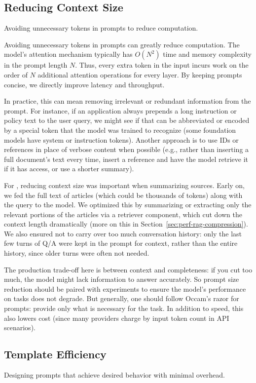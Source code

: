 \subsection{Reducing Context Size}
Avoiding unnecessary tokens in prompts to reduce computation.

Avoiding unnecessary tokens in prompts can greatly reduce computation. The model’s attention mechanism typically has $O(N^2)$ time and memory complexity in the prompt length $N$. Thus, every extra token in the input incurs work on the order of $N$ additional attention operations for every layer. By keeping prompts concise, we directly improve latency and throughput.

In practice, this can mean removing irrelevant or redundant information from the prompt. For instance, if an application always prepends a long instruction or policy text to the user query, we might see if that can be abbreviated or encoded by a special token that the model was trained to recognize (some foundation models have system or instruction tokens). Another approach is to use IDs or references in place of verbose content when possible (e.g., rather than inserting a full document’s text every time, insert a reference and have the model retrieve it if it has access, or use a shorter summary).

For \ishtar{}, reducing context size was important when summarizing sources. Early on, we fed the full text of articles (which could be thousands of tokens) along with the query to the model. We optimized this by summarizing or extracting only the relevant portions of the articles via a retriever component, which cut down the context length dramatically (more on this in Section~\ref{sec:perf-rag-compression}). We also ensured not to carry over too much conversation history: only the last few turns of Q/A were kept in the prompt for context, rather than the entire history, since older turns were often not needed.

The production trade-off here is between context and completeness: if you cut too much, the model might lack information to answer accurately. So prompt size reduction should be paired with experiments to ensure the model’s performance on tasks does not degrade. But generally, one should follow Occam’s razor for prompts: provide only what is necessary for the task. In addition to speed, this also lowers cost (since many providers charge by input token count in API scenarios).

\subsection{Template Efficiency}
Designing prompts that achieve desired behavior with minimal overhead.

